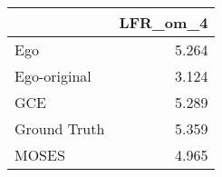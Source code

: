 \begin{tabular}{lr}
\toprule
{} & LFR_om_4 \\
\midrule
Ego          &    5.264 \\
Ego-original &    3.124 \\
GCE          &    5.289 \\
Ground Truth &    5.359 \\
MOSES        &    4.965 \\
\bottomrule
\end{tabular}
